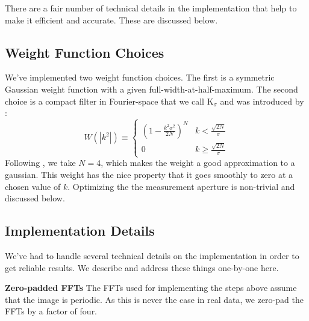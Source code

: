 \documentclass[twocolappendix, appendixfloats, numberedappendix, twocolumn, apj]{openjournal}
\newcommand{\ksigma}{\mbox{\boldmath $\mathrm{K}_{\sigma}$}\xspace}
\begin{document}
There are a fair number of technical details in the implementation that help to make it efficient and
accurate. These are discussed below.

\subsection{Weight Function Choices}

We've implemented two weight function choices. The first is a symmetric Gaussian weight
function with a given full-width-at-half-maximum. The second choice is a compact filter
in Fourier-space that we call \ksigma and was introduced by \citet{BernBFD2016}:
\begin{equation}
\label{ksigma}
W\left(|k^2|\right)  \equiv \left\{
\begin{array}{cc}
\left( 1 - \frac{k^2\sigma^2}{2N}\right)^N & k <
                                             \frac{\sqrt{2N}}{\sigma} \\
0 & k \ge
                                             \frac{\sqrt{2N}}{\sigma}
\end{array}
\right.
\end{equation}
Following \citet{BernBFD2016}, we take $N = 4$, which makes the weight a good
approximation to a gaussian.  This weight has the nice property that it goes
smoothly to zero at a chosen value of $k$. Optimizing the the measurement aperture
is non-trivial and discussed below.

\subsection{Implementation Details}

We've had to handle several technical details on the implementation in order to get reliable
results. We describe and address these things one-by-one here.

\textbf{Zero-padded FFTs} The FFTs used for implementing the steps above assume that
the image is periodic. As this is never the case in real data, we zero-pad the FFTs by a
factor of four.
\end{document}
